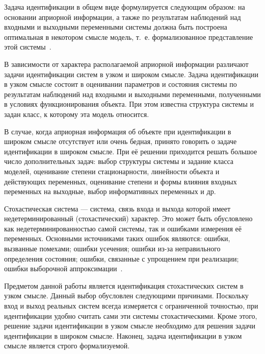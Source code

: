 Задача идентификации в общем виде формулируется следующим образом:
на основании априорной информации, а также по результатам наблюдений над
входными и выходными переменными системы должна быть построена оптимальная в
некотором смысле модель, т.~е. формализованное представление этой системы~\cite{eikhoff_1975}.

В зависимости от характера располагаемой априорной информации различают
задачи идентификации систем в узком и широком смысле.
Задача идентификации в узком смысле состоит в оценивании параметров и
состояния системы по результатам наблюдений над входными и выходными переменными,
полученными в условиях функционирования объекта.
При этом известна структура системы и задан класс, к которому эта модель относится.

В случае, когда априорная информация об объекте при идентификации в широком смысле отсутствует
или очень бедная, принято говорить о задаче идентификации в широком смысле.
При её решении приходится решать большое число дополнительных задач:
выбор структуры системы и задание класса моделей,
оценивание степени стационарности, линейности объекта и действующих переменных,
оценивание степени и формы влияния входных переменных на выходные,
выбор информативных переменных и др.

Стохастическая система --- система, связь входа и выхода которой имеет недетерминированный
(стохастический) характер. Это может быть обусловлено как недетерминированностью самой системы,
так и ошибками измерения её переменных.
Основными источниками таких ошибок являются:
ошибки, вызванные помехами;
ошибки усечения;
ошибки из-за неправильного определения состояния;
ошибки, связанные с упрощением при реализации;
ошибки выборочной аппроксимации~\cite{eikhoff_1975}.

{\color{red} Предметом данной работы является идентификация стохастических систем в узком смысле.
Данный выбор обусловлен следующими причинами.
Поскольку вход и выход реальных систем всегда измеряется с ограниченной точностью,
при идентификации удобно считать сами эти системы стохастическими.
Кроме этого, решение задачи идентификации в узком смысле необходимо для
решения задачи идентификации в широком смысле.
Наконец, задача идентификации в узком смысле является строго формализуемой.}

